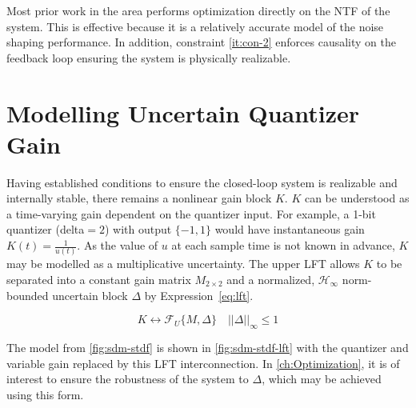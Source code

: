 Most prior work in the area performs optimization directly on the \gls{NTF} of the system. This is effective because it is a relatively accurate model of the noise shaping performance. In addition, constraint \ref{it:con-2} enforces causality on the feedback loop ensuring the system is physically realizable.

\section{Modelling Uncertain Quantizer Gain}
\label{sec:model-lft}

Having established conditions to ensure the closed-loop system is realizable and internally stable, there remains a nonlinear gain block $K$. $K$ can be understood as a time-varying gain dependent on the quantizer input. For example, a 1-bit quantizer (\gls{delta}$ = 2$) with output $\{-1, 1\}$ would have instantaneous gain $K(t) = \frac{1}{u(t)}$. As the value of $u$ at each sample time is not known in advance, $K$ may be modelled as a multiplicative uncertainty. The upper \gls{LFT} allows $K$ to be separated into a constant gain matrix $M_{2 \times 2}$ and a normalized, $\mathcal{H}_\infty$ norm-bounded uncertain block $\Delta$ by Expression~\ref{eq:lft}.

\begin{equation}
	K \leftrightarrow \mathcal{F}_U\{M, \Delta\} \quad ||\Delta||_\infty \leq 1 \label{eq:lft}
\end{equation}

The model from \autoref{fig:sdm-stdf} is shown in \autoref{fig:sdm-stdf-lft} with the quantizer and variable gain replaced by this \gls{LFT} interconnection. In \autoref{ch:Optimization}, it is of interest to ensure the robustness of the system to $\Delta$, which may be achieved using this form.

